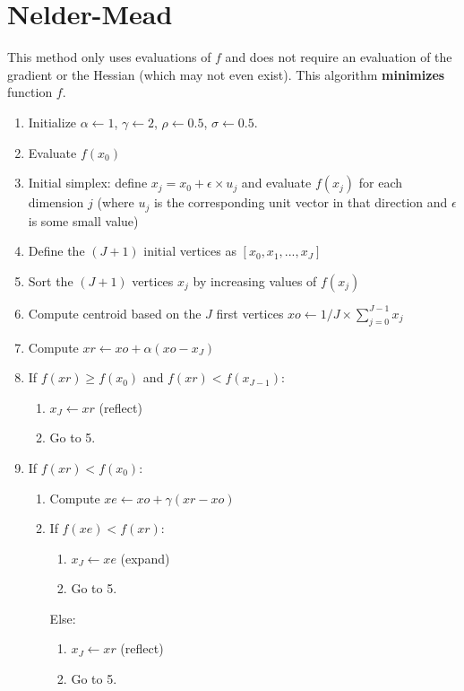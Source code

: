 \documentclass[12pt]{article}
\begin{document}
\section{Nelder-Mead}
This method only uses evaluations of $f$ and does not require an evaluation of the gradient or the Hessian (which may not even exist). This algorithm \textbf{minimizes} function $f$.
\begin{enumerate}
	\item Initialize $\alpha \leftarrow 1$, $\gamma \leftarrow 2$, $\rho \leftarrow 0.5$, $\sigma \leftarrow 0.5$.
	\item Evaluate $f(x_0)$
	\item Initial simplex: define $x_j = x_0 + \epsilon \times u_j$ and evaluate $f(x_j)$ for each dimension $j$ (where $u_j$ is the corresponding unit vector in that direction and $\epsilon$ is some small value)
	\item Define the  $(J+1)$ initial vertices as $[x_0, x_1, ..., x_J]$
	\item Sort the $(J+1)$ vertices $x_j$ by increasing values of $f(x_j)$
	\item Compute centroid based on the $J$ first vertices $xo \leftarrow 1/J \times \sum_{j=0}^{J-1} x_j$
	\item Compute $xr \leftarrow xo + \alpha (xo -x_{J})$
	\item If $f(xr) \ge f(x_0)$ and $f(xr) < f(x_{J-1})$:
		\begin{enumerate}
			\item $x_{J} \leftarrow xr $ \hspace*{5pt} (reflect)
			\item Go to 5.
		\end{enumerate}

	\item If $f(xr) < f(x_0)$:
		\begin{enumerate}
			\item Compute $xe \leftarrow xo + \gamma (xr - xo)$
			\item If $f(xe) < f(xr)$:
				\begin{enumerate}
					\item $x_{J} \leftarrow xe $ \hspace*{5pt} (expand)
					\item Go to 5.
				\end{enumerate}
				Else:
				\begin{enumerate}
					\item $x_{J} \leftarrow xr $ \hspace*{5pt} (reflect)
					\item Go to 5.
				\end{enumerate}
		\end{enumerate}
	

\end{enumerate}
\end{document}
